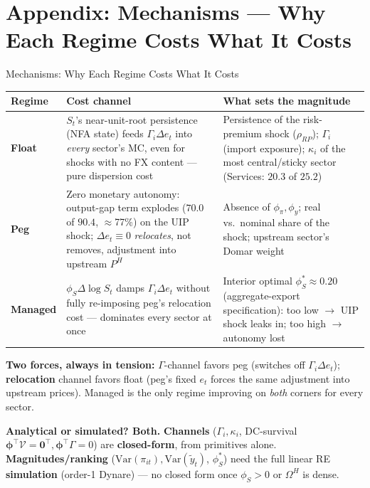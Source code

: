 \section*{Appendix: Mechanisms --- Why Each Regime Costs What It Costs}
\begin{frame}{Mechanisms: Why Each Regime Costs What It Costs}

{\scriptsize
\begin{tabular}{@{}p{1.2cm}p{4.3cm}p{4.3cm}@{}}
\toprule
\textbf{Regime} & \textbf{Cost channel} & \textbf{What sets the magnitude} \\
\midrule
\textbf{Float} & $S_t$'s near-unit-root persistence (NFA state) feeds $\Gamma_i\Delta e_t$ into \emph{every} sector's MC, even for shocks with no FX content --- pure dispersion cost & Persistence of the risk-premium shock ($\rho_{RP}$); $\Gamma_i$ (import exposure); $\kappa_i$ of the most central/sticky sector (Services: $20.3$ of $25.2$) \\
\textbf{Peg} & Zero monetary autonomy: output-gap term explodes ($70.0$ of $90.4$, $\approx$77\%) on the UIP shock; $\Delta e_t\equiv0$ \emph{relocates}, not removes, adjustment into upstream $P^H$ & Absence of $\phi_\pi,\phi_y$; real vs.\ nominal share of the shock; upstream sector's Domar weight \\
\textbf{Managed} & $\phi_S\Delta\log S_t$ damps $\Gamma_i\Delta e_t$ without fully re-imposing peg's relocation cost --- dominates every sector at once & Interior optimal $\phi_S^*\approx0.20$ (aggregate-export specification): too low $\to$ UIP shock leaks in; too high $\to$ autonomy lost \\
\bottomrule
\end{tabular}}

\vspace{2pt}
{\scriptsize \textbf{Two forces, always in tension:} $\Gamma$-channel favors peg (switches off $\Gamma_i\Delta e_t$); \textbf{relocation} channel favors float (peg's fixed $e_t$ forces the same adjustment into upstream prices). Managed is the only regime improving on \emph{both} corners for every sector.}

\vspace{2pt}
{\scriptsize \textbf{Analytical or simulated? Both.} \textbf{Channels} ($\Gamma_i,\kappa_i$, DC-survival $\bm\phi^\top\mathcal V{=}\bm0^\top,\bm\phi^\top\Gamma{=}0$) are \textbf{closed-form}, from primitives alone. \textbf{Magnitudes/ranking} ($\mathrm{Var}(\pi_{it}),\mathrm{Var}(\tilde y_t)$, $\phi_S^*$) need the full linear RE \textbf{simulation} (order-1 Dynare) --- no closed form once $\phi_S{>}0$ or $\Omega^H$ is dense.}

\end{frame}

